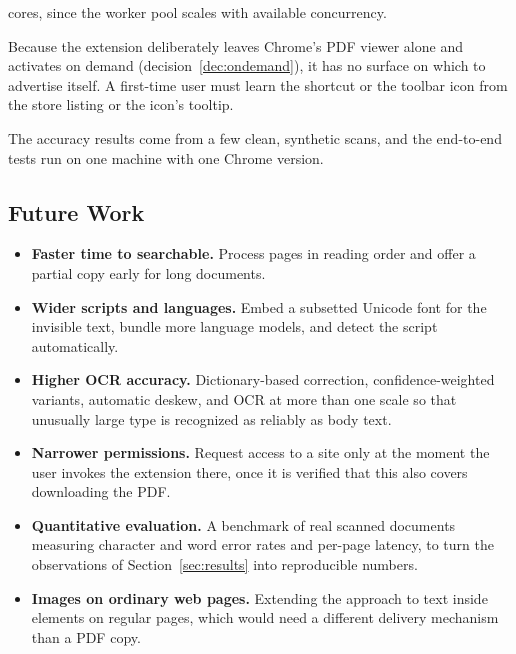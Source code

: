 \begin{description}[leftmargin=1.4em, style=nextline]
        cores, since the worker pool scales with available concurrency.
  \item[Discoverability.] Because the extension deliberately leaves Chrome's PDF
        viewer alone and activates on demand (decision~\ref{dec:ondemand}), it has
        no surface on which to advertise itself. A first-time user must learn the
        shortcut or the toolbar icon from the store listing or the icon's tooltip.
  \item[Limited evaluation.] The accuracy results come from a few clean,
        synthetic scans, and the end-to-end tests run on one machine with one
        Chrome version.
\end{description}

\subsection{Future Work}
\begin{itemize}
  \item \textbf{Faster time to searchable.} Process pages in reading order and
        offer a partial copy early for long documents.
  \item \textbf{Wider scripts and languages.} Embed a subsetted Unicode font for
        the invisible text, bundle more language models, and detect the script
        automatically.
  \item \textbf{Higher OCR accuracy.} Dictionary-based correction,
        confidence-weighted variants, automatic deskew, and OCR at more than one
        scale so that unusually large type is recognized as reliably as body text.
  \item \textbf{Narrower permissions.} Request access to a site only at the moment
        the user invokes the extension there, once it is verified that this also
        covers downloading the PDF.
  \item \textbf{Quantitative evaluation.} A benchmark of real scanned documents
        measuring character and word error rates and per-page latency, to turn
        the observations of Section~\ref{sec:results} into reproducible numbers.
  \item \textbf{Images on ordinary web pages.} Extending the approach to text
        inside  elements on regular pages, which would need a
        different delivery mechanism than a PDF copy.
\end{itemize}
